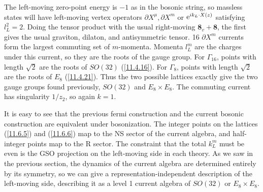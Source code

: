 The left-moving zero-point energy is $-1$ as in the bosonic string, so massless states will have left-moving vertex operators $\partial X^{\mu}, \partial X^{m}$ or $\mathrm{e}^{i k_{L}\cdot X(z)}$ satisfying $l_{L}^{2}=2$. Doing the tensor product with the usual right-moving $\mathbf{8}_{v}+\mathbf{8}$, the first gives the usual graviton, dilaton, and antisymmetric tensor. 16 $\partial X^{m}$ currents form the largest commuting set of $m$-momenta. Momenta $l_{L}^{m}$ are the charges under this current, so they are the roots of the gauge group. For $\Gamma_{16}$, points with length $\sqrt{2}$ are the roots of $SO(32)$ (\ref{11.4.16}). For $\Gamma_{8}$, points with length $\sqrt{2}$ are the roots of $E_{8}$ (\ref{11.4.21}). Thus the two possible lattices exactly give the two gauge groups found previously, $SO(32)$ and $E_{8}\times E_{8}$. The commuting current has singularity $1/z_{2}$, so again $k=1$.

It is easy to see that the previous fermi construction and the current bosonic construction are equivalent under bosonization. The integer points on the lattices (\ref{11.6.5}) and (\ref{11.6.6}) map to the NS sector of the current algebra, and half-integer points map to the R sector. The constraint that the total $k_{L}^{m}$ must be even is the GSO projection on the left-moving side in each theory. As we saw in the previous section, the dynamics of the current algebra are determined entirely by its symmetry, so we can give a representation-independent description of the left-moving side, describing it as a level 1 current algebra of $SO(32)$ or $E_{8}\times E_{8}$.

